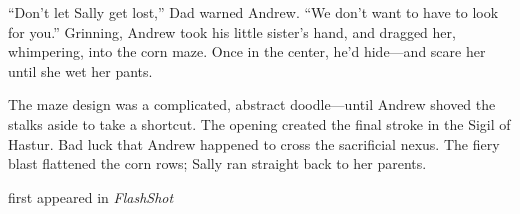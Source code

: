 
``Don't let Sally get lost,'' Dad warned Andrew. ``We don't want to have
to look for you.'' Grinning, Andrew took his little sister's hand, and
dragged her, whimpering, into the corn maze. Once in the center, he'd
hide---and scare her until she wet her pants.

The maze design was a complicated, abstract doodle---until Andrew shoved
the stalks aside to take a shortcut. The opening created the final
stroke in the Sigil of Hastur. Bad luck that Andrew happened to cross
the sacrificial nexus. The fiery blast flattened the corn rows; Sally
ran straight back to her parents.

first appeared in \emph{FlashShot}
